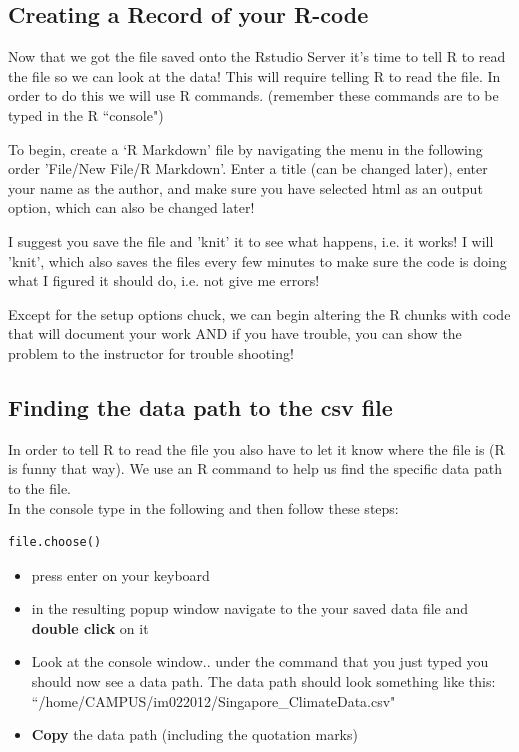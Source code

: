\documentclass{article}\usepackage[]{graphicx}\usepackage[]{color}
\begin{document}
\subsection{Creating a Record of your R-code}

Now that we got the file saved onto the Rstudio Server it's time to tell R to read the file so we can look at the data! This will require telling R to read the file. In order to do this we will use R commands. (remember these commands are to be typed in the R ``console") %

To begin, create a `R Markdown' file by navigating the menu in the following order 'File/New File/R Markdown'. Enter a title (can be changed later), enter your name as the author, and make sure you have selected html as an output option, which can also be changed later! 

I suggest you save the file and 'knit' it to see what happens, i.e. it works!  I will 'knit', which also saves the files every few minutes to make sure the code is doing what I figured it should do, i.e. not give me errors!

Except for the setup options chuck, we can begin altering the R chunks with code that will document your work AND if you have trouble, you can show the problem to the instructor for trouble shooting!

 \subsection{Finding the data path to the csv file}
In order to tell R to read the file you also have to let it know where the file is (R is funny that way). We use an R command to help us find the specific data path to the file. \\
In the console type in the following and then follow these steps: 
\begin{verbatim}
file.choose()
\end{verbatim}

\begin{itemize} 
\item press enter on your keyboard
\item in the resulting popup window navigate to the your saved data file and \textbf{double click} on it
\item Look at the console window.. under the command that you just typed you should now see a data path. The data path should look something like this: ``/home/CAMPUS/im022012/Singapore\_ClimateData.csv"  %

\item \textbf{Copy} the data path (including the quotation marks)
\end{itemize}
\end{document}
